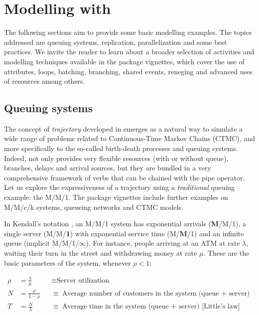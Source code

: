 \documentclass[
  nojss]{jss}
\begin{document}
\section[Modelling with simmer]{Modelling with }

The following sections aim to provide some basic modelling examples. The
topics addressed are queuing systems, replication, parallelization and
some best practices. We invite the reader to learn about a broader
selection of activities and modelling techniques available in the
package vignettes, which cover the use of attributes, loops, batching,
branching, shared events, reneging and advanced uses of resources among
others.

\subsection{Queuing systems}\label{queuing-systems}

The concept of \emph{trajectory} developed in  emerges as a
natural way to simulate a wide range of problems related to
Continuous-Time Markov Chains (CTMC), and more specifically to the
so-called birth-death processes and queuing systems. Indeed,
 not only provides very flexible resources (with or without
queue), branches, delays and arrival sources, but they are bundled in a
very comprehensive framework of verbs that can be chained with the pipe
operator. Let us explore the expressiveness of a  trajectory
using a \emph{traditional} queuing example: the M/M/1. The package
vignettes include further examples on M/M/c/k systems, queueing networks
and CTMC models.

In Kendall's notation \citep{Kendall:1953}, an M/M/1 system has
exponential arrivals (\textbf{M}/M/1), a single server (M/M/\textbf{1})
with exponential service time (M/\textbf{M}/1) and an infinite queue
(implicit M/M/1/\textbf{\(\infty\)}). For instance, people arriving at
an ATM at rate \(\lambda\), waiting their turn in the street and
withdrawing money at rate \(\mu\). These are the basic parameters of the
system, whenever \(\rho < 1\):

\begin{align}
\rho &= \frac{\lambda}{\mu} &&\equiv \mbox{Server utilization} \\
N &= \frac{\rho}{1-\rho} &&\equiv \mbox{Average number of customers in the system (queue $+$ server)} \label{eq:N}\\
T &= \frac{N}{\lambda} &&\equiv \mbox{Average time in the system (queue $+$ server) [Little's law]}
\end{align}
\end{document}
